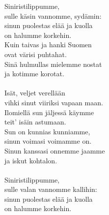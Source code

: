 
Siniristilippumme, \\ sulle käsin vannomme, sydämin: \\ sinun puolestas elää ja kuolla \\ on halumme korkehin. \\ Kuin taivas ja hanki Suomen \\ ovat värisi puhtahat. \\ Sinä hulmullas mielemme nostat \\ ja kotimme korotat. \\ \hspace{10mm} \\ Isät, veljet verellään \\ vihki sinut viiriksi vapaan maan. \\ Ilomiellä sun jäljessä käymme \\ teit' isäin astumaan. \\ Sun on kunnias kunniamme, \\ sinun voimasi voimamme on. \\ Sinun kanssasi onnemme jaamme \\ ja iskut kohtalon. \\ \hspace{10mm} \\ Siniristilippumme, \\ sulle valan vannomme kallihin: \\ sinun puolestas elää ja kuolla \\ on halumme korkehin.